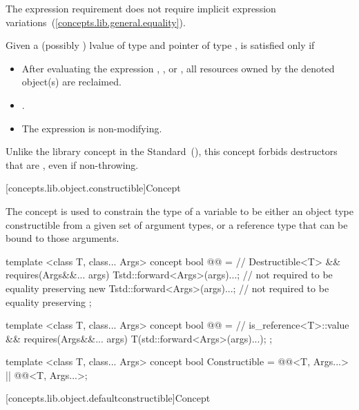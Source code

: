 \begin{itemdescr}
\pnum
The expression requirement  does not require implicit expression
variations~(\ref{concepts.lib.general.equality}).

\pnum
Given a (possibly ) lvalue  of type  and pointer
 of type ,  is satisfied only if

\begin{itemize}
\item After evaluating the expression ,
, or , all resources owned by
the denoted object(s) are reclaimed.
\item {}.
\item The expression  is non-modifying.
\end{itemize}

\pnum
\enternote Unlike the  library concept in the \Cpp
Standard~(), this concept forbids destructors
that are , even if non-throwing. \exitnote
\end{itemdescr}

[concepts.lib.object.constructible]{Concept }

\pnum
The  concept is used to constrain the type of a
variable to be either an object type constructible from a given set of argument
types, or a reference type that can be bound to those arguments.

%
\begin{itemdecl}
template <class T, class... Args>
concept bool @@ = // \expos
  Destructible<T> && requires(Args&&... args) {
    T{std::forward<Args>(args)...}; // not required to be equality preserving
    new T{std::forward<Args>(args)...}; // not required to be equality preserving
  };

template <class T, class... Args>
concept bool @@ = // \expos
  is_reference<T>::value && requires(Args&&... args) {
    T(std::forward<Args>(args)...);
  };

template <class T, class... Args>
concept bool Constructible =
  @@<T, Args...> ||
  @@<T, Args...>;
\end{itemdecl}

[concepts.lib.object.defaultconstructible]{Concept }

